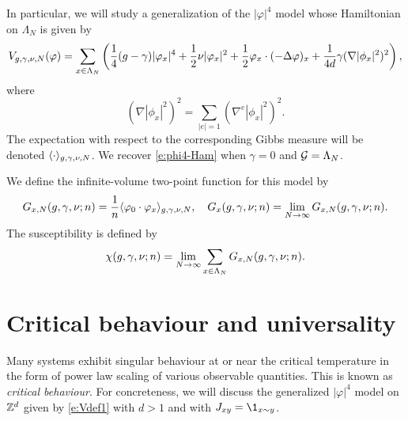 In particular, we will study a generalization of the $|\varphi|^4$ model whose Hamiltonian
on $\Lambda_N$ is given by
\begin{equation}
\label{e:Vdef1}
V_{g,\gamma,\nu,N}(\varphi)
	=
\sum_{x\in\Lambda_N}
\left(
	\frac{1}{4} (g - \gamma) |\varphi_x|^4
		+
	\frac{1}{2} \nu |\varphi_x|^2
		+
	\frac{1}{2} \varphi_x \cdot (-\Delta \varphi)_x
		+
	\frac{1}{4 d} \gamma (\nabla |\phi_x|^2)^2
\right),
\end{equation}
where
\begin{equation}
(\nabla |\phi_x|^2)^2
	=
\sum_{|e|=1} (\nabla^e |\phi_x|^2)^2.
\end{equation}
The expectation with respect to the corresponding Gibbs measure will
be denoted $\langle\cdot\rangle_{g,\gamma,\nu,N}$.
We recover \eqref{e:phi4-Ham} when $\gamma = 0$ and $\mathcal{G} = \Lambda_N$.

We define the infinite-volume two-point function for this model by
\begin{equation}
\label{e:two-point-function-phi4}
G_{x, N}(g,\gamma,\nu; n)
	=
\frac{1}{n} \langle \varphi_0 \cdot \varphi_x \rangle_{g,\gamma,\nu,N},
	\quad
G_x(g,\gamma,\nu; n)
	=
\lim_{N \rightarrow \infty} G_{x, N}(g,\gamma,\nu; n).
\end{equation}
The susceptibility is defined by
\begin{equation}
\label{e:susceptibility-def}
\chi(g, \gamma, \nu; n)
	=
\lim_{N\rightarrow\infty} \sum_{x\in\Lambda_N} G_{x,N}(g, \gamma, \nu; n).
\end{equation}


\section{Critical behaviour and universality}
\label{sec:crit}


Many systems exhibit singular behaviour at or near the critical temperature in
the form of power law scaling of various observable quantities. This is known as
\emph{critical behaviour}. For concreteness, we will discuss the generalized
$|\varphi|^4$ model on ${ {{\mathbb Z}}^d }$ given by \eqref{e:Vdef1} with $d > 1$ and with $J_{xy} = \1_{x\sim y}$.


